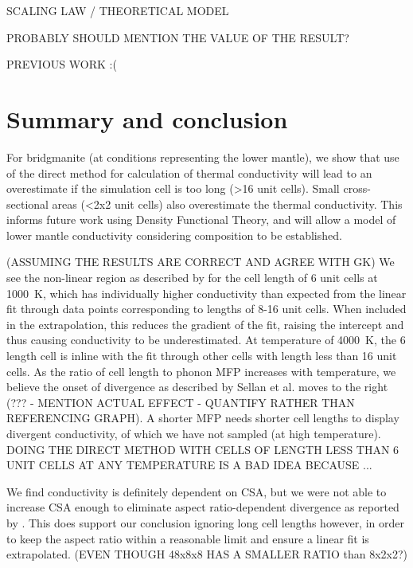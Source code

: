 \documentclass[%
preprint,                                  %
nofootinbib,
 amsmath,amssymb,
 aps,
]{revtex4-1}
\begin{document}
SCALING LAW / THEORETICAL MODEL

PROBABLY SHOULD MENTION THE VALUE OF THE RESULT?

PREVIOUS WORK :(







\section{\label{sec:summary}Summary and conclusion}

For bridgmanite (at conditions representing the lower mantle), we show that use of the direct method for calculation of thermal conductivity will lead to an overestimate if the simulation cell is too long (\textgreater 16 unit cells). Small cross-sectional areas (\textless 2x2 unit cells) also overestimate the thermal conductivity. This informs future work using Density Functional Theory, and will allow a model of lower mantle conductivity considering composition to be established.

(ASSUMING THE RESULTS ARE CORRECT AND AGREE WITH GK) We see the non-linear region as described by \citet{Sellan2010} for the cell length of 6 unit cells at 1000~K, which has individually higher conductivity than expected from the linear fit through data points corresponding to lengths of 8-16 unit cells. When included in the extrapolation, this reduces the gradient of the fit, raising the intercept and thus causing conductivity to be underestimated. At temperature of 4000~K, the 6 length cell is inline with the fit through other cells with length less than 16 unit cells. As the ratio of cell length to phonon MFP increases with temperature, we believe the onset of divergence as described by Sellan et al. moves to the right (??? - MENTION ACTUAL EFFECT - QUANTIFY RATHER THAN REFERENCING GRAPH). A shorter MFP needs shorter cell lengths to display divergent conductivity, of which we have not sampled (at high temperature). DOING THE DIRECT METHOD WITH CELLS OF LENGTH LESS THAN 6 UNIT CELLS AT ANY TEMPERATURE IS A BAD IDEA BECAUSE ... 

We find conductivity is definitely dependent on CSA, but we were not able to increase CSA enough to eliminate aspect ratio-dependent divergence as reported by \citet{Hu2011}. This does support our conclusion ignoring long cell lengths however, in order to keep the aspect ratio within a reasonable limit and ensure a linear fit is extrapolated. (EVEN THOUGH 48x8x8 HAS A SMALLER RATIO than 8x2x2?)
\end{document}
